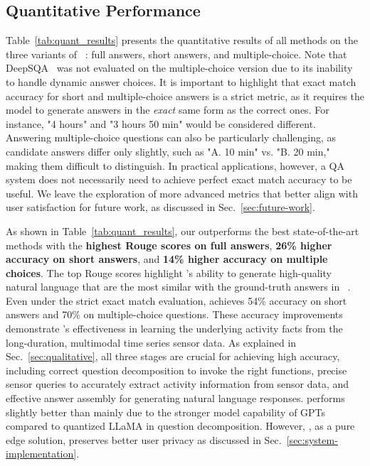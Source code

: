 \subsection{Quantitative Performance}

Table~\ref{tab:quant_results} presents the quantitative results of all methods on the three variants of \Dataset~\citesensorqa: full answers, short answers, and multiple-choice. Note that DeepSQA~\cite{xing2021deepsqa} was not evaluated on the multiple-choice version due to its inability to handle dynamic answer choices.
It is important to highlight that exact match accuracy for short and multiple-choice answers is a strict metric, as it requires the model to generate answers in the \textit{exact} same form as the correct ones. For instance, "4 hours" and "3 hours 50 min" would be considered different. Answering multiple-choice questions can also be particularly challenging, as candidate answers differ only slightly, such as "A. 10 min" vs. "B. 20 min," making them difficult to distinguish. In practical applications, however, a QA system does not necessarily need to achieve perfect exact match accuracy to be useful. We leave the exploration of more advanced metrics that better align with user satisfaction for future work, as discussed in Sec.~\ref{sec:future-work}.

As shown in Table~\ref{tab:quant_results}, our \Method outperforms the best state-of-the-art methods with the \textbf{highest Rouge scores on full answers}, \textbf{26\% higher accuracy on short answers}, and \textbf{14\% higher accuracy on multiple choices}. 
The top Rouge scores highlight \Method's ability to generate high-quality natural language that are the most similar with the ground-truth answers in \Dataset~\citesensorqa.
Even under the strict exact match evaluation, \Method achieves 54\% accuracy on short answers and 70\% on multiple-choice questions. These accuracy improvements demonstrate \Method's effectiveness in learning the underlying activity facts from the long-duration, multimodal time series sensor data. As explained in Sec.~\ref{sec:qualitative}, all three stages are crucial for achieving high accuracy, including correct question decomposition to invoke the right functions, precise sensor queries to accurately extract activity information from sensor data, and effective answer assembly for generating natural language responses.
\MethodC performs slightly better than \MethodE mainly due to the stronger model capability of GPTs compared to quantized LLaMA in question decomposition. However, \MethodE, as a pure edge solution, preserves better user privacy as discussed in Sec.~\ref{sec:system-implementation}.

